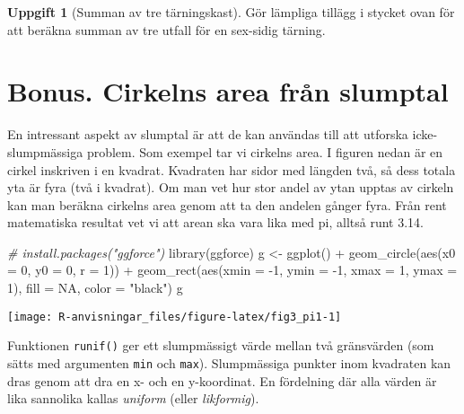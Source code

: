 \documentclass[
]{book}
\newenvironment{Shaded}{\begin{snugshade}}{\end{snugshade}}
\newcommand{\AttributeTok}[1]{\textcolor[rgb]{0.77,0.63,0.00}{#1}}
\newcommand{\CommentTok}[1]{\textcolor[rgb]{0.56,0.35,0.01}{\textit{#1}}}
\newcommand{\ConstantTok}[1]{\textcolor[rgb]{0.00,0.00,0.00}{#1}}
\newcommand{\DecValTok}[1]{\textcolor[rgb]{0.00,0.00,0.81}{#1}}
\newcommand{\FunctionTok}[1]{\textcolor[rgb]{0.00,0.00,0.00}{#1}}
\newcommand{\NormalTok}[1]{#1}
\newcommand{\OtherTok}[1]{\textcolor[rgb]{0.56,0.35,0.01}{#1}}
\newcommand{\SpecialCharTok}[1]{\textcolor[rgb]{0.00,0.00,0.00}{#1}}
\newcommand{\StringTok}[1]{\textcolor[rgb]{0.31,0.60,0.02}{#1}}
\theoremstyle{definition}
\theoremstyle{definition}
\theoremstyle{definition}
\newtheorem{exercise}{Uppgift}[chapter]
\theoremstyle{definition}
\theoremstyle{remark}
\begin{document}
\begin{exercise}[Summan av tre tärningskast]
Gör lämpliga tillägg i stycket ovan för att beräkna summan av tre utfall för en sex-sidig tärning.
\end{exercise}

\hypertarget{bonus.-cirkelns-area-fruxe5n-slumptal}{%
\section{Bonus. Cirkelns area från slumptal}\label{bonus.-cirkelns-area-fruxe5n-slumptal}}

En intressant aspekt av slumptal är att de kan användas till att utforska icke-slumpmässiga problem. Som exempel tar vi cirkelns area. I figuren nedan är en cirkel inskriven i en kvadrat. Kvadraten har sidor med längden två, så dess totala yta är fyra (två i kvadrat). Om man vet hur stor andel av ytan upptas av cirkeln kan man beräkna cirkelns area genom att ta den andelen gånger fyra. Från rent matematiska resultat vet vi att arean ska vara lika med pi, alltså runt 3.14.

\begin{Shaded}
\begin{Highlighting}[]
\CommentTok{\# install.packages("ggforce")}
\FunctionTok{library}\NormalTok{(ggforce)}
\NormalTok{g }\OtherTok{\textless{}{-}} \FunctionTok{ggplot}\NormalTok{() }\SpecialCharTok{+} 
  \FunctionTok{geom\_circle}\NormalTok{(}\FunctionTok{aes}\NormalTok{(}\AttributeTok{x0 =} \DecValTok{0}\NormalTok{, }\AttributeTok{y0 =} \DecValTok{0}\NormalTok{, }\AttributeTok{r =} \DecValTok{1}\NormalTok{)) }\SpecialCharTok{+} 
  \FunctionTok{geom\_rect}\NormalTok{(}\FunctionTok{aes}\NormalTok{(}\AttributeTok{xmin =} \SpecialCharTok{{-}}\DecValTok{1}\NormalTok{, }\AttributeTok{ymin =} \SpecialCharTok{{-}}\DecValTok{1}\NormalTok{, }\AttributeTok{xmax =} \DecValTok{1}\NormalTok{, }\AttributeTok{ymax =} \DecValTok{1}\NormalTok{), }\AttributeTok{fill =} \ConstantTok{NA}\NormalTok{, }\AttributeTok{color =} \StringTok{"black"}\NormalTok{)}
\NormalTok{g}
\end{Highlighting}
\end{Shaded}

\begin{center}\texttt{[image: R-anvisningar\_files/figure-latex/fig3\_pi1-1]} \end{center}

Funktionen \texttt{runif()} ger ett slumpmässigt värde mellan två gränsvärden (som sätts med argumenten \texttt{min} och \texttt{max}). Slumpmässiga punkter inom kvadraten kan dras genom att dra en x- och en y-koordinat. En fördelning där alla värden är lika sannolika kallas \emph{uniform} (eller \emph{likformig}).
\end{document}

